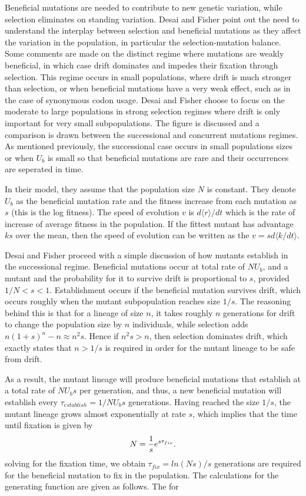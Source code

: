 \documentclass[12pt,twocolumn]{article}
\begin{document}
Beneficial mutations are needed to contribute to new genetic variation, while selection eliminates on standing variation.  Desai and Fisher point out the need to understand the interplay between selection and beneficial mutations as they affect the variation in the population, in particular the selection-mutation balance.  Some comments are made on the distinct regime where mutations are weakly beneficial, in which case drift dominates and impedes their fixation through selection.  This regime occurs in small populations, where drift is much stronger than selection, or when beneficial mutations have a very weak effect, such as in the case of synonymous codon usage.  Desai and Fisher choose to focus on the moderate to large populations in strong selection regimes where drift is only important for very small subpopulations.  The figure is discussed and a comparison is drawn between the successional and concurrent mutations regimes.  As mentioned previously, the successional case occurs in small populations sizes or when $U_b$ is small so that beneficial mutations are rare and their occurrences are seperated in time.

In their model, they assume that the population size $N$ is constant.  They denote $U_b$ as the beneficial mutation rate and the fitness increase from each   mutation as $s$ (this is the log fitness).  The speed of evolution $v$ is $d\langle r \rangle / dt$ which is the rate of increase of average fitness in the population.  If the fittest mutant has advantage $ks$ over the mean, then the speed of evolution can be written as the $v=sd\langle k  / dt \rangle$.  

Desai and Fisher proceed with a simple discussion of how mutants establish in the successional regime.  Beneficial mutations occur at total rate of $NU_b$, and a mutant and the probability for it to survive drift is proportional to $s$, provided $1/N<s<1$.  Establishment occurs if the beneficial mutation survives drift, which occurs roughly when the mutant subpopulation reaches size $1/s$.  The reasoning behind this is that for a lineage of size $n$, it takes roughly $n$ generations for drift to change the population size by $n$ individuals, while selection adds $n(1+s)^n-n \approx n^2s$.  Hence if $n^2s>n$, then selection dominates drift, which exactly states that $n>1/s$ is required in order for the mutant lineage to be safe from drift. 

As a result, the mutant lineage will produce beneficial mutations that establish at a total rate of $NU_bs$ per generation, and thus, a new beneficial mutation will establish every $\tau_{establish} = 1/NU_bs$ generations.  Having reached the size $1/s$, the mutant lineage grows almost exponentially at rate $s$, which implies that the time until fixation is given by
\[
N={1 \over s}e^{s \tau_{fix}}.
\]
solving for the fixation time, we obtain $\tau_{fix}=ln(Ns)/s$ generations are required for the beneficial mutation to fix in the population.  
The calculations for the generating function are given as follows. The for
\end{document}
